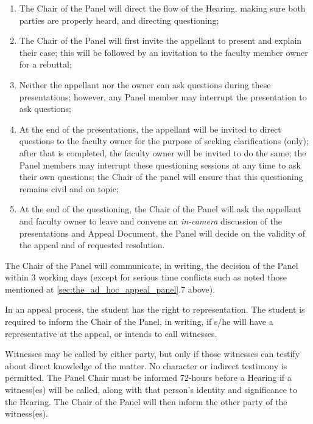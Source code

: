 \begin{enumerate}

\item The Chair of the Panel will direct the flow of the Hearing, making sure
    both parties are properly heard, and directing questioning;

\item The Chair of the Panel will first invite the appellant to present and
    explain their case; this will be followed by an invitation to the faculty
    member owner for a rebuttal;

\item Neither the appellant nor the owner can ask questions during these
    presentations; however, any Panel member may interrupt the presentation to
    ask questions;

\item At the end of the presentations, the appellant will be invited to direct
    questions to the faculty owner for the purpose of seeking clarifications
    (only); after that is completed, the faculty owner will be invited to do
    the same;  the Panel members may interrupt these questioning sessions at
    any time to ask their own questions; the Chair of the panel will ensure
    that this questioning remains civil and on topic;

\item At the end of the questioning, the Chair of the Panel will ask the
    appellant and faculty owner to leave and convene an \emph{in-camera}
    discussion of the presentations and Appeal Document, the Panel will decide
    on the validity of the appeal and of requested resolution.

\end{enumerate}

\p The Chair of the Panel will communicate, in writing, the decision of
the Panel within 3 working days (except for serious time conflicts such as
noted those mentioned at \ref{sec:the_ad_hoc_appeal_panel}.7 above).

\p In an appeal process, the student has the right to representation.
The student is required to inform the Chair of the Panel, in writing, if s/he
will have a representative at the appeal, or intends to call witnesses. 

\p Witnesses may be called by either party, but only if those witnesses
can testify about direct knowledge of the matter.  No character or indirect
testimony is permitted.  The Panel Chair must be informed 72-hours before a
Hearing if a witness(es) will be called, along with that person's identity and
significance to the Hearing.  The Chair of the Panel will then inform the other
party of the witness(es).  

